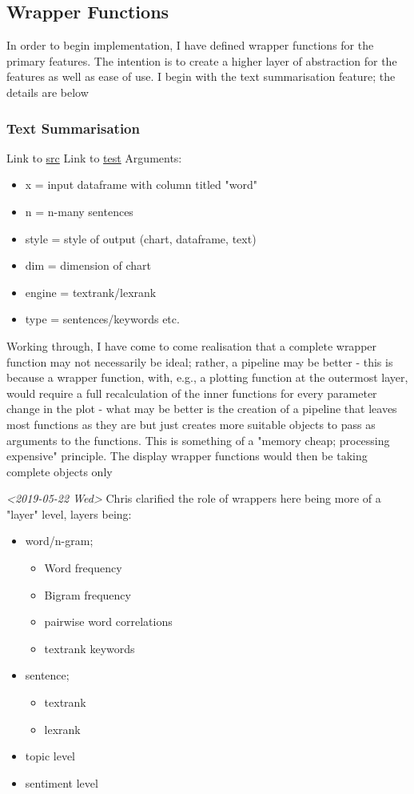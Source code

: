 \documentclass[a4paper, 11pt]{article}
\begin{document}
\subsection{Wrapper Functions}
\label{sec:org32bdb75}
In order to begin implementation, I have defined wrapper functions for
the primary features. The intention is to create a higher layer of
abstraction for the features as well as ease of use. I begin with the
text summarisation feature; the details are below
\subsubsection{Text Summarisation}
\label{sec:org82ee10e}
Link to \href{file:///home/user/curr/stats-781/src/summ-wrapper.R}{src}
Link to \href{file:///home/user/curr/stats-781/test/summ-wrapper-test.R}{test}
Arguments:
\begin{itemize}
\item x = input dataframe with column titled "word"
\item n = n-many sentences
\item style = style of output (chart, dataframe, text)
\item dim = dimension of chart
\item engine = textrank/lexrank
\item type = sentences/keywords etc.
\end{itemize}

Working through, I have come to come realisation that a complete
wrapper function may not necessarily be ideal; rather, a pipeline may
be better - this is because a wrapper function, with, e.g., a plotting
function at the outermost layer, would require a full recalculation of
the inner functions for every parameter change in the plot - what may
be better is the creation of a pipeline that leaves most functions as
they are but just creates more suitable objects to pass as arguments
to the functions. This is something of a "memory cheap; processing
expensive" principle. The display wrapper functions would then be
taking complete objects only 

\textit{<2019-05-22 Wed> } Chris clarified the role of wrappers here being more
of a "layer" level, layers being:
\begin{itemize}
\item word/n-gram;
\begin{itemize}
\item Word frequency
\item Bigram frequency
\item pairwise word correlations
\item textrank keywords
\end{itemize}
\item sentence;
\begin{itemize}
\item textrank
\item lexrank
\end{itemize}
\item topic level
\item sentiment level
\end{itemize}
\end{document}
